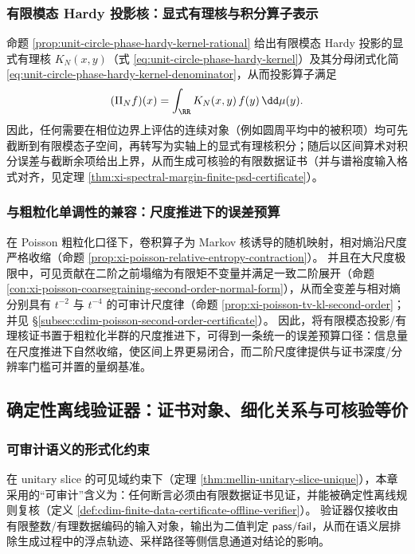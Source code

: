 \subsubsection{有限模态 Hardy 投影核：显式有理核与积分算子表示}
命题 \ref{prop:unit-circle-phase-hardy-kernel-rational} 给出有限模态 Hardy 投影的显式有理核 \(K_N(x,y)\)（式 \eqref{eq:unit-circle-phase-hardy-kernel}）及其分母闭式化简 \eqref{eq:unit-circle-phase-hardy-kernel-denominator}，从而投影算子满足
\[
(\Pi_N f)(x)=\int_{\RR} K_N(x,y)\,f(y)\,\dd\mu(y).
\]
因此，任何需要在相位边界上评估的连续对象（例如圆周平均中的被积项）均可先截断到有限模态子空间，再转写为实轴上的显式有理核积分；随后以区间算术对积分误差与截断余项给出上界，从而生成可核验的有限数据证书（并与谱裕度输入格式对齐，见定理 \ref{thm:xi-spectral-margin-finite-psd-certificate}）。

\subsubsection{与粗粒化单调性的兼容：尺度推进下的误差预算}
在 Poisson 粗粒化口径下，卷积算子为 Markov 核诱导的随机映射，相对熵沿尺度严格收缩（命题 \ref{prop:xi-poisson-relative-entropy-contraction}）。
并且在大尺度极限中，可见贡献在二阶之前塌缩为有限矩不变量并满足一致二阶展开（命题 \ref{con:xi-poisson-coarsegraining-second-order-normal-form}），从而全变差与相对熵分别具有 \(t^{-2}\) 与 \(t^{-4}\) 的可审计尺度律（命题 \ref{prop:xi-poisson-tv-kl-second-order}；并见 \S\ref{subsec:cdim-poisson-second-order-certificate}）。
因此，将有限模态投影/有理核证书置于粗粒化半群的尺度推进下，可得到一条统一的误差预算口径：信息量在尺度推进下自然收缩，使区间上界更易闭合，而二阶尺度律提供与证书深度/分辨率门槛可并置的量纲基准。

\subsection{确定性离线验证器：证书对象、细化关系与可核验等价}\label{subsec:cdim-deterministic-offline-verifier-certificates}
\subsubsection{可审计语义的形式化约束}
在 unitary slice 的可见域约束下（定理 \ref{thm:mellin-unitary-slice-unique}），本章采用的“可审计”含义为：任何断言必须由有限数据证书见证，并能被确定性离线规则复核（定义 \ref{def:cdim-finite-data-certificate-offline-verifier}）。
验证器仅接收由有限整数/有理数据编码的输入对象，输出为二值判定 \(\mathsf{pass}/\mathsf{fail}\)，从而在语义层排除生成过程中的浮点轨迹、采样路径等侧信息通道对结论的影响。

